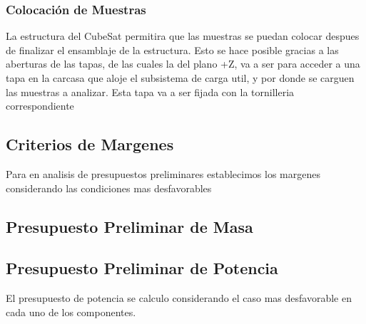     \subsubsection{Colocación de Muestras}

      La estructura del CubeSat permitira que las muestras se puedan colocar despues de
      finalizar el ensamblaje de la estructura. Esto se hace posible gracias a las aberturas de las
      tapas, de las cuales la del plano +Z, va a ser para acceder a una tapa en la carcasa que aloje
      el subsistema de carga util, y por donde se carguen las muestras a analizar. Esta tapa va a
      ser fijada con la tornilleria correspondiente

  \subsection{Criterios de Margenes}
    Para en analisis de presupuestos preliminares establecimos los margenes considerando las
    condiciones mas desfavorables

  \subsection{Presupuesto Preliminar de Masa}

  \subsection{Presupuesto Preliminar de Potencia}
    El presupuesto de potencia se calculo considerando el caso mas desfavorable en cada uno
    de los componentes.

    \begin{table}[H]
    \centering
    \caption{Consumo de corriente y potencia de los componentes en el caso más desfavorable.}
    \label{tab:consumo_componentes}
    \end{table}

